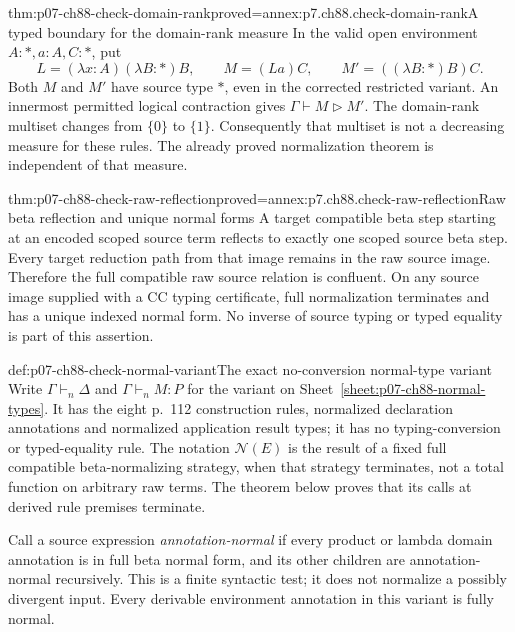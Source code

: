 \begin{hbtheorem}{thm:p07-ch88-check-domain-rank}{proved=annex:p7.ch88.check-domain-rank}{A typed boundary for the domain-rank measure}
In the valid open environment \(A:\ast,a:A,C:\ast\), put
\[
 L=(\lambda x:A)(\lambda B:\ast)B,\qquad
 M=(La)C,\qquad M'=((\lambda B:\ast)B)C.
\]
Both \(M\) and \(M'\) have source type \(\ast\), even in the
corrected restricted variant. An innermost permitted logical contraction
gives \(\Gamma\vdash M\triangleright M'\).
The domain-rank multiset changes from \(\{0\}\) to
\(\{1\}\). Consequently that multiset is not a
decreasing measure for these rules. The already proved normalization
theorem is independent of that measure.
\end{hbtheorem}

\begin{hblemma}{thm:p07-ch88-check-raw-reflection}{proved=annex:p7.ch88.check-raw-reflection}{Raw beta reflection and unique normal forms}
A target compatible beta step starting at an encoded scoped source term
reflects to exactly one scoped source beta step. Every target reduction
path from that image remains in the raw source image. Therefore the full
compatible raw source relation is confluent. On any source image supplied
with a CC typing certificate, full normalization terminates and has a
unique indexed normal form. No inverse of source typing or typed equality
is part of this assertion.
\end{hblemma}

\begin{hbdefinition}{def:p07-ch88-check-normal-variant}{The exact no-conversion normal-type variant}
Write \(\Gamma\vdash_n\Delta\) and \(\Gamma\vdash_n M:P\) for
the variant on Sheet~\ref{sheet:p07-ch88-normal-types}. It has the
eight p.~112 construction rules, normalized declaration annotations and
normalized application result types; it has no typing-conversion or
typed-equality rule. The notation \(\mathcal N(E)\) is the result of
a fixed full compatible beta-normalizing strategy, when that strategy
terminates, not a total function on arbitrary raw terms. The theorem
below proves that its calls at derived rule premises terminate.

Call a source expression \emph{annotation-normal} if every product or
lambda domain annotation is in full beta normal form, and its other
children are annotation-normal recursively. This is a finite syntactic
test; it does not normalize a possibly divergent input. Every derivable
environment annotation in this variant is fully normal.
\end{hbdefinition}

